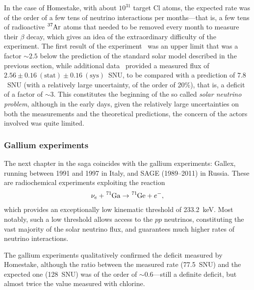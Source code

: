 In the case of Homestake, with about $10^{31}$ target Cl atoms, the expected rate
was of the order of a few tens of neutrino interactions per months---that is, a
few tens of radioactive $\ce{^37Ar}$ atoms that needed to be removed every month
to measure their $\beta$ decay, which gives an idea of the extraordinary difficulty
of the experiment. The first result of the experiment~\cite{1968PhRvL..20.1205D}
was an upper limit that was a factor $\sim 2.5$ below the prediction of the standard
solar model described in the previous section, while additional data~\cite{1998ApJ...496..505C}
provided a measured flux of $2.56 \pm 0.16~(\text{stat}) \pm 0.16~(\text{sys})$~SNU, to be compared with a prediction of $7.8$~SNU (with
a relatively large uncertainty, of the order of 20\%), that is, a deficit of a factor
of $\sim 3$. This constitutes the beginning of the
so called \emph{solar neutrino problem}, although in the early days, given the relatively
large uncertainties on both the measurements and the theoretical predictions, the
concern of the actors involved was quite limited.


\subsubsection{Gallium experiments}

The next chapter in the saga coincides with the gallium experiments: Gallex, running
between 1991 and 1997 in Italy, and SAGE (1989--2011) in Russia. These are radiochemical
experiments exploiting the reaction
\begin{align*}
  \nu_e + \ce{^71Ga} \rightarrow \ce{^71Ge} + e^-,
\end{align*}
which provides an exceptionally low kinematic threshold of 233.2~keV. Most notably,
such a low threshold allows access to the $pp$ neutrinos, constituting the vast
majority of the solar neutrino flux, and guarantees much higher rates of neutrino
interactions.

The gallium experiments qualitatively confirmed the deficit measured
by Homestake, although the ratio between the measured rate (77.5~SNU) and the
expected one (128~SNU) was of the order of $\sim 0.6$---still a definite deficit,
but almost twice the value measured with chlorine\cite{1999PhLB..447..127H}.



